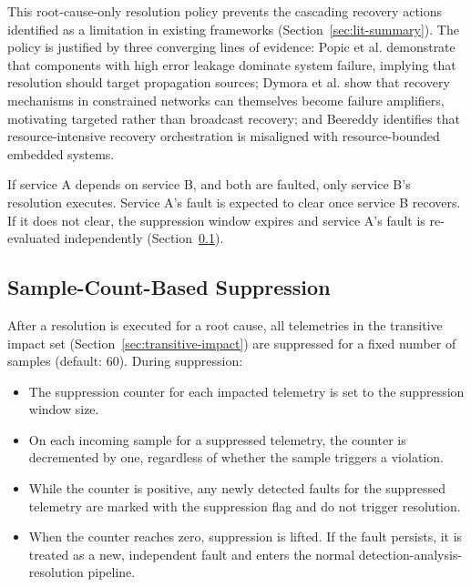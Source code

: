 This root-cause-only resolution policy prevents the cascading recovery actions identified as a limitation in existing frameworks (Section~\ref{sec:lit-summary}). The policy is justified by three converging lines of evidence: Popic et al. \cite{ref7} demonstrate that components with high error leakage dominate system failure, implying that resolution should target propagation sources; Dymora et al. \cite{ref16} show that recovery mechanisms in constrained networks can themselves become failure amplifiers, motivating targeted rather than broadcast recovery; and Beereddy \cite{ref17} identifies that resource-intensive recovery orchestration is misaligned with resource-bounded embedded systems.

If service A depends on service B, and both are faulted, only service B's resolution executes. Service A's fault is expected to clear once service B recovers. If it does not clear, the suppression window expires and service A's fault is re-evaluated independently (Section~\ref{sec:sample-count-suppression}).

\subsection{Sample-Count-Based Suppression}\label{sec:sample-count-suppression}

After a resolution is executed for a root cause, all telemetries in the transitive impact set (Section~\ref{sec:transitive-impact}) are suppressed for a fixed number of samples (default: 60). During suppression:

\begin{itemize}
\item The suppression counter for each impacted telemetry is set to the suppression window size.
\item On each incoming sample for a suppressed telemetry, the counter is decremented by one, regardless of whether the sample triggers a violation.
\item While the counter is positive, any newly detected faults for the suppressed telemetry are marked with the suppression flag and do not trigger resolution.
\item When the counter reaches zero, suppression is lifted. If the fault persists, it is treated as a new, independent fault and enters the normal detection-analysis-resolution pipeline.
\end{itemize}

